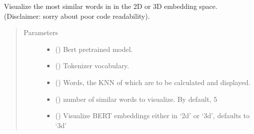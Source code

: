 \documentclass[letterpaper,10pt,english]{sphinxmanual}
\begin{document}
\begin{fulllineitems}
\label{\detokenize{code:code_utils.plotter.plot_bert_embeddings_nn}}
Visualize the  most similar words in  in the 2D or 3D
embedding space. (Disclaimer: sorry about poor code readability).
\begin{quote}\begin{description}
\item[{Parameters}] \leavevmode\begin{itemize}
\item {} 
 () \textendash{} Bert pretrained model.

\item {} 
 () \textendash{} Tokenizer vocabulary.

\item {} 
 () \textendash{} Words, the KNN of which are to be calculated and
displayed.

\item {} 
 (\sphinxstyleliteralemphasis{\sphinxupquote{, }}) \textendash{} number of similar words to visualize. By default, 5

\item {} 
 (\sphinxstyleliteralemphasis{\sphinxupquote{, }}) \textendash{} Visualize BERT embeddings either in ‘2d’ or
‘3d’, defaults to ‘3d’


\end{itemize}
\end{description}
\end{quote}
\end{fulllineitems}
\end{document}
